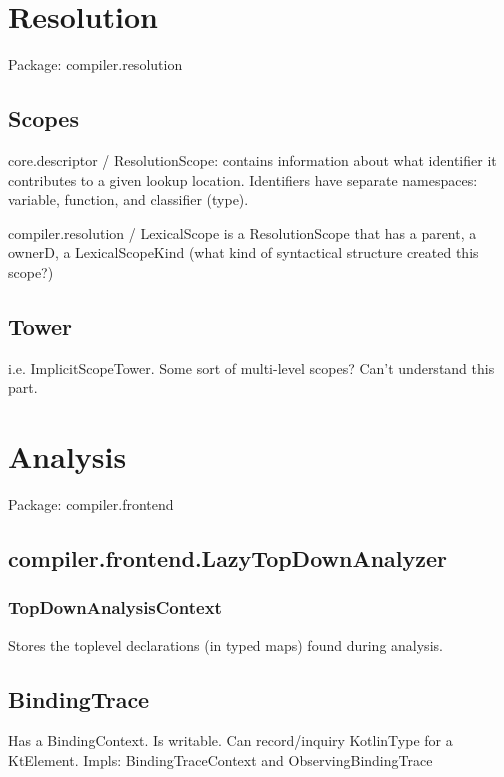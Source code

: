 \documentclass{article}
\begin{document}
\section{Resolution}
\label{sec:reso}

Package: compiler.resolution

\subsection{Scopes}

core.descriptor / ResolutionScope: contains information about what identifier it contributes to a given lookup location. Identifiers have separate namespaces: variable, function, and classifier (type).

compiler.resolution / LexicalScope is a ResolutionScope that has a parent, a ownerD, a LexicalScopeKind (what kind of syntactical structure created this scope?)

\subsection{Tower}

i.e. ImplicitScopeTower. Some sort of multi-level scopes? Can't understand this part.

\section{Analysis}

Package: compiler.frontend

\subsection{compiler.frontend.LazyTopDownAnalyzer}

\subsubsection{TopDownAnalysisContext}

Stores the toplevel declarations (in typed maps) found during analysis.

\subsection{BindingTrace}

Has a BindingContext. Is writable. Can record/inquiry KotlinType for a KtElement.
Impls: BindingTraceContext and ObservingBindingTrace
\end{document}

